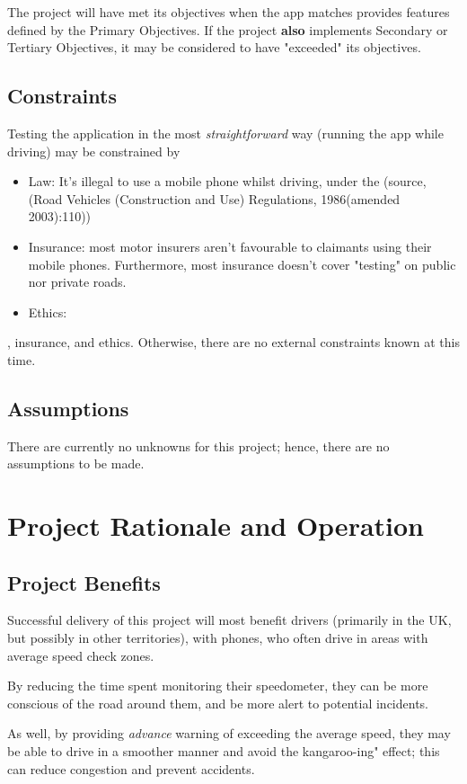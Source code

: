 \documentclass[11pt, a4paper, notitlepage]{report}
\begin{document}
The project will have met its objectives when the app matches provides features 
defined by the Primary Objectives. If the project \textbf{also} implements 
Secondary or Tertiary Objectives, it may be considered to have "exceeded" its 
objectives.

\section{Constraints}
Testing the application in the most \textit{straightforward} way (running the 
app while driving) may be constrained by
\begin{itemize}
	\item Law: It's illegal to use a mobile phone whilst driving, under the 
	(source, (Road Vehicles (Construction and Use) Regulations, 1986(amended 
	2003):110))
	\item Insurance: most motor insurers aren't favourable to claimants using 
	their mobile phones. Furthermore, most insurance doesn't cover "testing" on 
	public nor private roads.
	\item Ethics: 
\end{itemize}, insurance, and 
ethics. Otherwise, there are no 
external constraints known at this time.

\section{Assumptions}
There are currently no unknowns for this project; hence, there are no 
assumptions to be made.

\chapter{Project Rationale and Operation}
\section{Project Benefits}
Successful delivery of this project will most benefit drivers (primarily in the 
UK, but possibly in other territories), with phones, who often drive in areas 
with average speed check zones. 

By reducing the time spent monitoring their speedometer, they can be more 
conscious of the road around them, and be more alert to potential incidents.

As well, by providing \textit{advance} warning of exceeding the average speed, 
they may be able to drive in a smoother manner and avoid the kangaroo-ing" 
effect; this can reduce congestion and prevent accidents.
\end{document}
